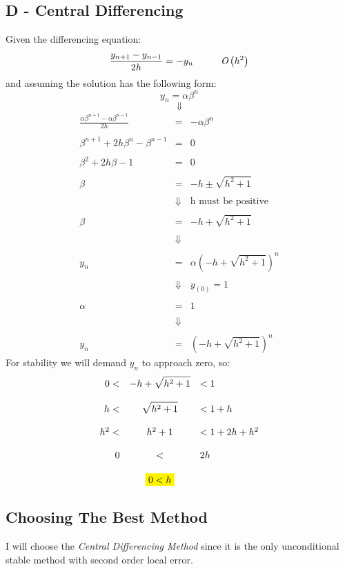 \documentclass[11pt, a4paper]{article}
\begin{document}
\subsection{D - Central Differencing}
Given the differencing equation:
\begin{equation}
    \frac{y_{n+1}-y_{n-1}}{2h}=-y_n\hspace{1cm}\emph{O}\left(h^2\right)
\end{equation}
and assuming the solution has the following form:
\begin{equation}
    y_n=\alpha\beta^n
\end{equation}
\begin{equation*}
    \Downarrow
\end{equation*}
\begin{equation}
    \begin{array}{rcl}
        \displaystyle\frac{\alpha\beta^{n+1}-\alpha\beta^{n-1}}{2h} & = & -\alpha\beta^n \\\\
        \beta^{n+1}+2h\beta^n-\beta^{n-1} & = & 0 \\\\
        \beta^2+2h\beta-1 & = & 0 \\\\
        \beta & = & \displaystyle-h\pm\sqrt{h^2+1} \\\\
        & \Downarrow & \text{h must be positive} \\\\
        \beta & = & \displaystyle-h+\sqrt{h^2+1} \\\\
        & \Downarrow & \\\\
        y_n & = & \alpha\left(\displaystyle-h+\sqrt{h^2+1}\right)^n \\\\
        & \Downarrow & y_{\left(0\right)}=1 \\\\
        \alpha & = & 1 \\\\
        & \Downarrow & \\\\
        y_n & = & \left(\displaystyle-h+\sqrt{h^2+1}\right)^n
    \end{array}
\end{equation}
For stability we will demand $y_n$ to approach zero, so:
\begin{equation}
    \begin{array}{rcl}
        0<&\displaystyle-h+\sqrt{h^2+1}&<1 \\\\
        h<&\displaystyle\sqrt{h^2+1}&<1+h \\\\
        h^2<&h^2+1&<1+2h+h^2 \\\\
        0&<&2h \\\\
        &\colorbox{yellow}{$0<h$}&
    \end{array}
\end{equation}

\subsection{Choosing The Best Method}
I will choose the \emph{Central Differencing Method} since it is the only unconditional stable method with second order local error.
\end{document}
